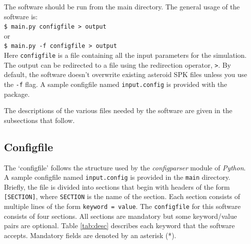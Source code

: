 \documentclass[10pt,a4paper]{article}
\begin{document}
The software should be run from the main directory. The general usage
of the software is: \\

\verb+$ main.py configfile > output+ \\
or \\
\verb+$ main.py -f configfile > output+ \\

Here \verb+configfile+ is a file containing all the input parameters
for the simulation. The output can be redirected to a file using the
redirection operator, \verb+>+. By default, the software doesn't
overwrite existing asteroid SPK files unless you use the \verb+-f+
flag. A sample configfile named \verb+input.config+ is provided with
the package.

The descriptions of the various files needed by the software are given
in the subsections that follow.

\subsection{Configfile}

The `configfile' follows the structure used by the \emph{configparser}
module of \emph{Python}. A sample configfile named \verb+input.config+
is provided in the \verb+main+ directory. Briefly, the file is divided
into sections that begin with headers of the form \verb+[SECTION]+,
where \verb+SECTION+ is the name of the section. Each section consists
of multiple lines of the form \verb+keyword = value+.  The
\verb+configfile+ for this software consists of four sections. All
sections are mandatory but some keyword/value pairs are optional.
Table \ref{tab:desc} describes each keyword that the software
accepts. Mandatory fields are denoted by an asterisk (*).
\end{document}
